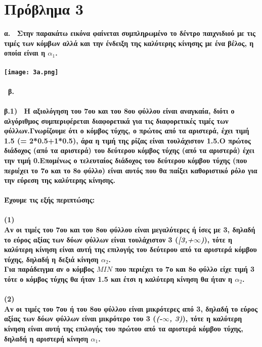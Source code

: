 \documentclass[10pt]{article}
\begin{document}
\section*{Πρόβλημα 3}
\vspace{1em}
\bf α. \ \normalfont Στην παρακάτω εικόνα φαίνεται συμπληρωμένο το δέντρο παιχνιδιού με τις τιμές των κόμβων αλλά και την ένδειξη της καλύτερης κίνησης με ένα βέλος, η οποία είναι η $α_{1}$. \\ \\
\texttt{[image: 3a.png]}\\\\\
\bf β. \\ \\ 
β.1) \ \normalfont Η αξιολόγηση του 7ου και του 8ου φύλλου είναι αναγκαία, διότι ο αλγόριθμος συμπεριφέρεται διαφορετικά για τις διαφορετικές τιμές των φύλλων.Γνωρίζουμε ότι ο κόμβος τύχης, ο πρώτος από τα αριστερά, έχει τιμή 1.5 (= 2*0.5+1*0.5), άρα η τιμή της ρίζας είναι τουλάχιστον 1.5.Ο πρώτος διάδοχος (από τα αριστερά) του δεύτερου κόμβος τύχης (από τα αριστερά) έχει την τιμή 0.Επομένως ο τελευταίος διάδοχος του δεύτερου κόμβου τύχης (που περιέχει το 7ο και το 8ο φύλλο) είναι αυτός που θα παίξει καθοριστικό ρόλο για την εύρεση της καλύτερης κίνησης.\\ \\ Έχουμε τις εξής περιπτώσης: \\ \\
(\textbf{1}) \\

Αν οι τιμές του 7ου και του 8ου φύλλου είναι μεγαλύτερες ή ίσες με 3, δηλαδή το εύρος αξίας των δύων φύλλων είναι τουλάχιστον 3 (\textit{[3,+$\infty$)}), τότε η καλύτερη κίνηση είναι αυτή  της επιλογής του δεύτερου από τα αριστερά κόμβου τύχης, δηλαδή η δεξιά κίνηση $α_{2}$. \\

Για παράδειγμα αν ο κόμβος $MIN$ που περιέχει το 7ο και 8ο φύλλο είχε τιμή 3 τότε ο κόμβος τύχης θα ήταν 1.5 και έτσι η καλύτερη κίνηση θα ήταν η $α_{2}$. \\ \\
(\textbf{2}) \\

Αν οι τιμές του 7ου ή του 8ου φύλλου είναι μικρότερες από 3, δηλαδή το εύρος αξίας των δύων φύλλων είναι μικρότερο του 3 (\textit{(-$\infty$, 3)}), τότε η καλύτερη κίνηση είναι αυτή της επιλογής του πρώτου από τα αριστερά κόμβου τύχης, δηλαδή η αριστερή κίνηση $α_{1}$. \\
\end{document}

